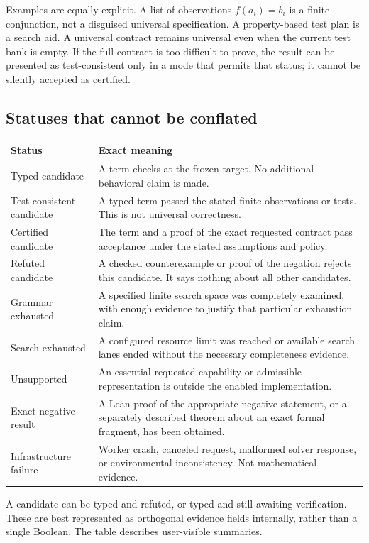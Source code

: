 Examples are equally explicit. A list of observations $f(a_i)=b_i$ is a finite conjunction, not a disguised universal specification. A property-based test plan is a search aid. A universal contract remains universal even when the current test bank is empty. If the full contract is too difficult to prove, the result can be presented as test-consistent only in a mode that permits that status; it cannot be silently accepted as certified.

\subsection{Statuses that cannot be conflated}
\begin{longtable}{@{}L{0.24\textwidth}L{0.71\textwidth}@{}}
\toprule
Status & Exact meaning\\\midrule\endhead
Typed candidate & A term checks at the frozen target. No additional behavioral claim is made.\\
Test-consistent candidate & A typed term passed the stated finite observations or tests. This is not universal correctness.\\
Certified candidate & The term and a proof of the exact requested contract pass acceptance under the stated assumptions and policy.\\
Refuted candidate & A checked counterexample or proof of the negation rejects this candidate. It says nothing about all other candidates.\\
Grammar exhausted & A specified finite search space was completely examined, with enough evidence to justify that particular exhaustion claim.\\
Search exhausted & A configured resource limit was reached or available search lanes ended without the necessary completeness evidence.\\
Unsupported & An essential requested capability or admissible representation is outside the enabled implementation.\\
Exact negative result & A Lean proof of the appropriate negative statement, or a separately described theorem about an exact formal fragment, has been obtained.\\
Infrastructure failure & Worker crash, canceled request, malformed solver response, or environmental inconsistency. Not mathematical evidence.\\
\bottomrule
\end{longtable}
A candidate can be typed and refuted, or typed and still awaiting verification. These are best represented as orthogonal evidence fields internally, rather than a single Boolean. The table describes user-visible summaries.

